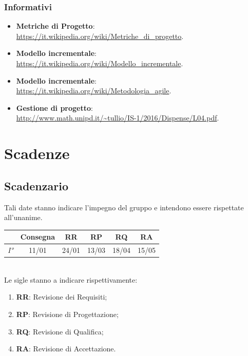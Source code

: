 \documentclass[12pt,a4paper,titlepage]{article}
\begin{document}
	\subsubsection{Informativi}
	\begin{itemize}
		\item \textbf{Metriche di Progetto}: \\
		\textcolor{blue}{\url{https://it.wikipedia.org/wiki/Metriche_di_progetto}}.
		\item \textbf{Modello incrementale}: \\
		\textcolor{blue}{\url{https://it.wikipedia.org/wiki/Modello_incrementale}}.
		\item \textbf{Modello incrementale}: \\
		\textcolor{blue}{\url{https://it.wikipedia.org/wiki/Metodologia_agile}}.
		\item \textbf{Gestione di progetto}: \\
		\textcolor{blue}{\url{http://www.math.unipd.it/~tullio/IS-1/2016/Dispense/L04.pdf}}.
	\end{itemize}
	
	\newpage
	
	\section{Scadenze}
	\subsection{Scadenzario}
	Tali date stanno indicare l'impegno del gruppo e intendono essere rispettate all'unanime.\\
	
	{\renewcommand\arraystretch{1.2} %
		\begin{tabular}{|l|c|c|c|c|c|}
			\hline
			& Consegna & \textbf{RR} & \textbf{RP} & \textbf{RQ} & \textbf{RA} \\
			\hline
			\textit{I°} & 11/01 & 24/01 & 13/03 & 18/04 & 15/05 \\
			\hline
	\end{tabular}}
	\vspace{0.5cm}
	\\
	Le sigle stanno a indicare rispettivamente:
	\begin{enumerate}
		\item \textbf{RR}: Revisione dei Requisiti;
		\item \textbf{RP}: Revisione di Progettazione;
		\item \textbf{RQ}: Revisione di Qualifica;
		\item \textbf{RA}: Revisione di Accettazione. 
	\end{enumerate}
	
\end{document}
